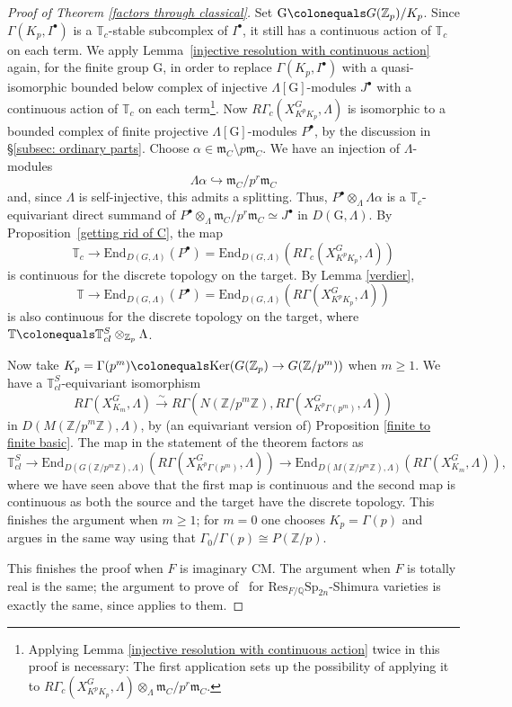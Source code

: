 \documentclass{amsart}
\theoremstyle{remark}
\numberwithin{equation}{subsection}
\newcommand{\Q}{\QQ}
\newcommand{\Z}{\ZZ}
\newcommand{\m}{\frakm}
\newcommand{\QQ}{{\mathbb Q}}
\newcommand{\ZZ}{{\mathbb Z}}
\newcommand{\frakm}{\mathfrak{m}}
\newcommand{\Zp}{\Z_p}
\newcommand{\toisom}{\xrightarrow{\sim}}
\newcommand{\defeq}{\colonequals}
\renewcommand{\(}{\left(}
\renewcommand{\)}{\right)}
\begin{document}
\begin{proof}[Proof of Theorem \ref{factors through classical}]
\medskip

Set $\mathrm{G}\defeq G(\Z_p)/K_p$. Since $\Gamma(K_p, I^\bullet)$ is a $\mathbb{T}_c$-stable subcomplex of $I^\bullet$, it still has a continuous action of $\mathbb{T}_c$ on each term. We apply Lemma~\ref{injective resolution with continuous action} again, for the finite group $\mathrm{G}$, in order to replace $\Gamma(K_p,I^\bullet)$ with a quasi-isomorphic bounded below complex of injective $\Lambda[\mathrm{G}]$-modules $J^\bullet$ with a continuous action of $\mathbb{T}_c$ on each term\footnote{Applying Lemma \ref{injective resolution with continuous action} twice in this proof is necessary: The first application sets up the possibility of applying it to $R\Gamma_c(X_{K^p K_p}^G,\Lambda) \otimes_{\Lambda}\m_C/p^r\m_C$.}. Now $R\Gamma_c(X_{K^p K_p}^G,\Lambda)$ is isomorphic to a bounded complex of finite projective $\Lambda[\mathrm{G}]$-modules $P^\bullet$, by the discussion in \S \ref{subsec: ordinary parts}.  Choose $\alpha\in \m_C\setminus p\m_C$. We have an injection of $\Lambda$-modules
\[
\Lambda\alpha \hookrightarrow \m_C/p^r\m_C
\] 
and, since $\Lambda$ is self-injective, this admits a splitting. Thus, $P^\bullet\otimes_{\Lambda}\Lambda\alpha$ is a $\mathbb{T}_c$-equivariant direct summand of $P^\bullet \otimes_{\Lambda}\m_C/p^r\m_C\simeq J^\bullet$ in $D(\mathrm{G},\Lambda)$.
By Proposition~\ref{getting rid of C}, the map 
\[
\mathbb{T}_c \to \mathrm{End}_{D(G,\Lambda)}(P^\bullet) = \mathrm{End}_{D(G,\Lambda)}(R\Gamma_c(X_{K^p K_p}^G,\Lambda))
\]
is continuous for the discrete topology on the target.
By Lemma \ref{verdier},
\[
\mathbb{T}\to \mathrm{End}_{D(G,\Lambda)}(P^\bullet) = \mathrm{End}_{D(G,\Lambda)}(R\Gamma(X_{K^p K_p}^G,\Lambda))
\]
is also continuous for the discrete topology on the target,
where $\mathbb{T} \defeq \mathbb{T}^S_{cl} \otimes_{\Zp} \Lambda$.

\medskip

Now take $K_p=\Gamma(p^m)\defeq \mathrm{Ker}(G(\Zp) \to G(\Z/p^m))$ when $m\geq 1$. We have a $\mathbb{T}^S_{cl}$-equivariant isomorphism
\[
R\Gamma(X_{K_m}^G,\Lambda)\toisom R\Gamma\left(N(\Z/p^m\Z), R\Gamma(X_{K^p \Gamma(p^m)}^G,\Lambda) \right)
\]
in $D(M(\Z/p^m\Z),\Lambda)$, by (an equivariant version of) Proposition \ref{finite to finite basic}. The map in the statement of the theorem
factors as 
\[
\mathbb{T}^S_{cl}\to \mathrm{End}_{D(G(\Z/p^m\Z),\Lambda)}\left(R\Gamma(X_{K^p \Gamma(p^m)}^G,\Lambda)\right)\to \mathrm{End}_{D(M(\Z/p^m\Z), \Lambda)}\left(R\Gamma(X_{K_m}^G,\Lambda)\right),
\]
where we have seen above that the first map is continuous and the second map is continuous as both the source and the target have the discrete topology. This finishes the argument when $m\geq 1$; for $m=0$ one chooses $K_p=\Gamma(p)$ and argues in the same way using that $\Gamma_0/\Gamma(p) \cong P(\Z/p)$.

\medskip

This finishes the proof when $F$ is imaginary CM. The argument when $F$ is totally real is the same; the argument to prove of~\cite[Lemma 5.23]{newton-thorne} for $\mathrm{Res}_{F/\Q}\mathrm{Sp}_{2n}$-Shimura varieties is exactly the same, since \cite[\S 4]{scholze-galois} applies to them.
\end{proof}
\end{document}
